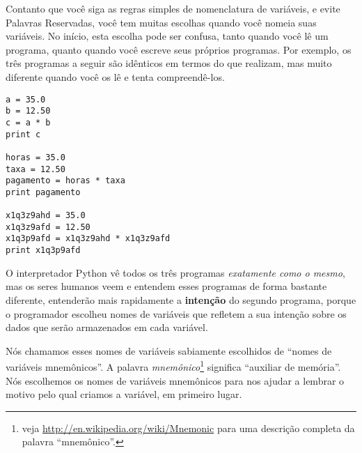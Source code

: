Contanto que você siga as regras simples de nomenclatura de variáveis, e evite 
Palavras Reservadas, você tem muitas escolhas quando você nomeia suas variáveis. 
No início, esta escolha pode ser confusa, tanto quando você lê um 
programa, quanto quando você escreve seus próprios programas. Por exemplo, os 
três programas a seguir são idênticos em termos do que realizam, 
mas muito diferente quando você os lê e tenta compreendê-los.

\beforeverb
\begin{verbatim}
a = 35.0
b = 12.50
c = a * b
print c

horas = 35.0
taxa = 12.50
pagamento = horas * taxa
print pagamento

x1q3z9ahd = 35.0
x1q3z9afd = 12.50
x1q3p9afd = x1q3z9ahd * x1q3z9afd
print x1q3p9afd
\end{verbatim}
\afterverb
%

O interpretador Python vê todos os três programas \emph{exatamente como o 
mesmo}, mas os seres humanos veem e entendem esses programas de forma bastante 
diferente, entenderão mais rapidamente a {\bf intenção} do segundo programa, porque o 
programador escolheu nomes de variáveis que refletem a sua intenção
sobre os dados que serão armazenados em cada variável.

Nós chamamos esses nomes de variáveis sabiamente escolhidos de ``nomes de 
variáveis mnemônicos''. A palavra \emph{mnemônico}\footnote{veja 
\url{http://en.wikipedia.org/wiki/Mnemonic} para uma descrição completa da 
palavra ``mnemônico''.} significa ``auxiliar de memória''. 
Nós escolhemos os nomes de variáveis mnemônicos para nos ajudar a lembrar o motivo 
pelo qual criamos a variável, em primeiro lugar.


